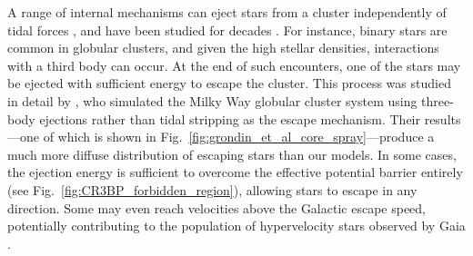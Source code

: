             A range of internal mechanisms can eject stars from a cluster independently of tidal forces \citep{2003gmbp.book.....H}, and have been studied for decades \citep{1978RvMP...50..437L,1990ApJ...351..121C,1997A&ARv...8....1M}. For instance, binary stars are common in globular clusters, and given the high stellar densities, interactions with a third body can occur. At the end of such encounters, one of the stars may be ejected with sufficient energy to escape the cluster. This process was studied in detail by \citet{2023MNRAS.518.4249G,2024MNRAS.528.5189G}, who simulated the Milky Way globular cluster system using three-body ejections rather than tidal stripping as the escape mechanism. Their results—one of which is shown in Fig.~\ref{fig:grondin_et_al_core_spray}—produce a much more diffuse distribution of escaping stars than our models. In some cases, the ejection energy is sufficient to overcome the effective potential barrier entirely (see Fig.~\ref{fig:CR3BP_forbidden_region}), allowing stars to escape in any direction. Some may even reach velocities above the Galactic escape speed, potentially contributing to the population of hypervelocity stars observed by Gaia \citep{2021ApJS..252....3L}.
